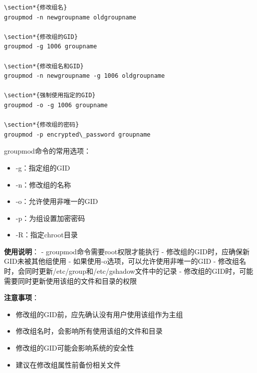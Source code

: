 \documentclass[12pt,UTF8]{ctexbook}
\begin{document}
\begin{verbatim}
\section*{修改组名}
groupmod -n newgroupname oldgroupname

\section*{修改组的GID}
groupmod -g 1006 groupname

\section*{修改组名和GID}
groupmod -n newgroupname -g 1006 oldgroupname

\section*{强制使用指定的GID}
groupmod -o -g 1006 groupname

\section*{修改组的密码}
groupmod -p encrypted\_password groupname
\end{verbatim}

groupmod命令的常用选项：
\begin{itemize}
    \item -g：指定组的GID
    \item -n：修改组的名称
    \item -o：允许使用非唯一的GID
    \item -p：为组设置加密密码
    \item -R：指定chroot目录
\end{itemize}

\textbf{使用说明}：
- groupmod命令需要root权限才能执行
- 修改组的GID时，应确保新GID未被其他组使用
- 如果使用-o选项，可以允许使用非唯一的GID
- 修改组名时，会同时更新/etc/group和/etc/gshadow文件中的记录
- 修改组的GID时，可能需要同时更新使用该组的文件和目录的权限

\textbf{注意事项}：
\begin{itemize}
    \item 修改组的GID前，应先确认没有用户使用该组作为主组
    \item 修改组名时，会影响所有使用该组的文件和目录
    \item 修改组的GID可能会影响系统的安全性
    \item 建议在修改组属性前备份相关文件
\end{itemize}
\end{document}
